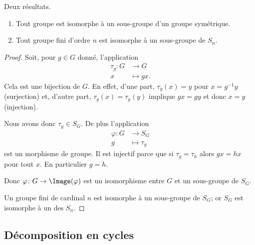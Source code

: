 \begin{lemma}        \label{LEMooUPBOooWbwMTx}
    Deux résultats.
    \begin{enumerate}
        \item
            Tout groupe est isomorphe à un sous-groupe d'un groupe symétrique.
        \item
            Tout groupe fini d'ordre \( n\) est isomorphe à un sous-groupe de \( S_n\).
    \end{enumerate}
\end{lemma}

\begin{proof}
    Soit, pour \( g\in G\) donné, l'application
    \begin{equation}
        \begin{aligned}
            \tau_g\colon G&\to G \\
            x&\mapsto gx.
        \end{aligned}
    \end{equation}
    Cela est une bijection de \( G\). En effet, d'une part, \( \tau_g(x)=y\) pour \( x=g^{-1} y\) (surjection) et, d'autre part, \( \tau_g(x)=\tau_g(y)\) implique \( gx=gy\) et donc \( x=y\) (injection).

    Nous avons donc \( \tau_g\in S_G\). De plus l'application
    \begin{equation}
        \begin{aligned}
            \varphi\colon G&\to S_G \\
            g&\mapsto \tau_g
        \end{aligned}
    \end{equation}
    est un morphisme de groupe. Il est injectif parce que si \( \tau_g=\tau_h\) alors \( gx=hx\) pour tout \( x\). En particulier \( g=h\).

    Donc \( \varphi\colon G\to \Image(\varphi)\) est un isomorphisme entre \( G\) et un sous-groupe de \( S_G\).

    Un groupe fini de cardinal \( n\) est isomorphe à un sous-groupe de \( S_G\); or \( S_G\) est isomorphe à un des \( S_n\).
\end{proof}
\subsection{Décomposition en cycles}

